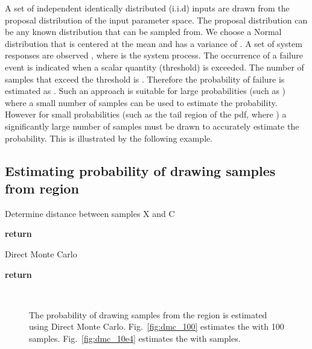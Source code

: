 \documentclass[journal]{IEEEtran}
\begin{document}
A set of  independent identically distributed (i.i.d) inputs  are drawn from the proposal distribution  of the input parameter space. The proposal distribution can be any known distribution that can be sampled from. We choose a Normal distribution that is centered at the mean  and has a variance of . A set of system responses are observed , where  is the system process. The occurrence of a failure event  is indicated when a scalar quantity  (threshold) is exceeded. The number of samples that exceed the threshold is . Therefore the probability of failure is estimated as . Such an approach is suitable for large probabilities (such as ) where a small number of samples can be used to estimate the probability. However for small probabilities (such as the tail region of the pdf, where ) a significantly large number of samples must be drawn to accurately estimate the probability. This is illustrated by the following example.

\subsection{Estimating probability of drawing samples from region }
\begin{algorithm}[!t]\caption{Determine distance between samples X and C}
\label{alg:h}
\begin{algorithmic}[1]
        \State 
\State 
				
	\State \textbf{return }	
	\EndFunction
\end{algorithmic}
\end{algorithm}

\begin{algorithm}[!t]\caption{Direct Monte Carlo}
\label{alg:dmc}
\begin{algorithmic}[1]
	
\State 
	
\For{\texttt{}}
\State 
        \State 
        \State 
				
\State  {}
\If {}
					\State 
				\EndIf
      \EndFor
			
\State 
	\State \textbf{return }	
	\EndFunction
\end{algorithmic}
\end{algorithm}

\begin{figure}[!t]\centering
	\\
	\caption{The probability of drawing samples from the region  is estimated using Direct Monte Carlo. Fig.~\ref{fig:dmc_100} estimates the  with 100 samples. Fig.~\ref{fig:dmc_10e4} estimates the  with  samples.}
	\label{fig:DMC_100_10e4}
\end{figure}
\end{document}
